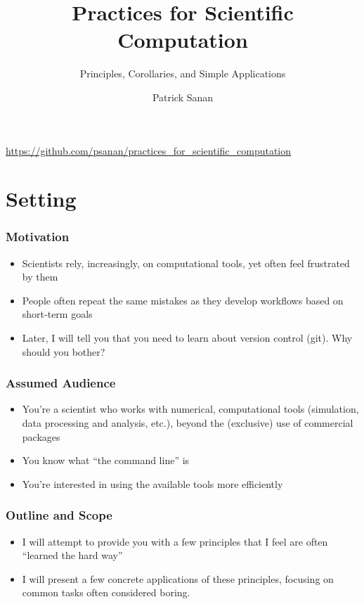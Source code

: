 \documentclass{beamer}
\author{Patrick Sanan}
\institute[ETHZ]
{
Institute of Geophysics, ETH Zurich\\
\href{mailto:patrick.sanan@erdw.ethz.ch}{patrick.sanan@erdw.ethz.ch}
}
\title{Practices for Scientific Computation}
\subtitle[]{Principles, Corollaries, and Simple Applications}
\date[]{}
\begin{document}
\begin{frame}[fragile]
\titlepage
\begin{center}
\href{https://github.com/psanan/practices_for_scientific_computation}{https://github.com/psanan/practices\_for\_scientific\_computation}
\end{center}
\end{frame}

\begin{frame}
\tableofcontents
\end{frame}

\section{Setting}

\begin{frame}[fragile]
\frametitle{Motivation}
\begin{itemize}
  \item Scientists rely, increasingly, on computational tools, yet often feel frustrated by them
  \item People often repeat the same mistakes as they develop workflows based on short-term goals
\item Later, I will tell you that you need to learn about version control (git). Why should you bother?
\end{itemize}
\end{frame}

\begin{frame}[fragile]
\frametitle{Assumed Audience}
\begin{itemize}
\item You're a scientist who works with numerical, computational tools (simulation, data processing and analysis, etc.), beyond the (exclusive) use of commercial packages
\item You know what ``the command line'' is
\item You're interested in using the available tools more efficiently
\end{itemize}
\end{frame}

\begin{frame}[fragile]
\frametitle{Outline and Scope}
\begin{itemize}
  \item I will attempt to provide you with a few principles that I feel are often ``learned the hard way''
  \item I will present a few concrete applications of these principles, focusing on common tasks often considered boring.
\end{itemize}
\end{frame}
\end{document}
